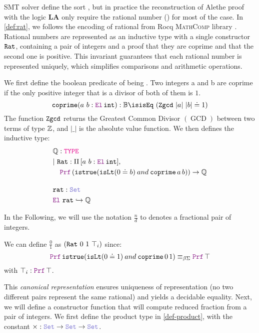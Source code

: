 
SMT solver define the sort , but in practice the reconstruction of Alethe proof with the logic \textbf{LA} only require the rational number (\Q) for most of the case.
In \cref{def:rat}, we follows the encoding of rational from Rocq \cite{Rocq-refman} \textsc{MathComp} library \cite{mathcomp}.
Rational numbers are represented as an inductive type with a single constructor $\texttt{\upshape{Rat}}$, containing a pair of integers and a proof that they are coprime and that the second one is positive.
This invariant guarantees that each rational number is represented uniquely, which simplifies comparisons and arithmetic operations.

\begin{definition}[Rational]\label{def:rat}
We first define the boolean predicate of being . Two integers a and b are coprime if the only positive integer that is a divisor of both of them is $1$.
\begin{equation*}
\kw{coprime} (a~b: \el\,\kw{int}): \B \is  \kw{isEq}~(\kw{Zgcd}~|a|~|b| \doteq 1)
\end{equation*}
The function $\texttt{\upshape{Zgcd}}$ returns the Greatest Common Divisor $(\mathop{GCD})$ between two terms of type $\mathbb{Z}$, and $|\_|$ is the absolute value function.
We then defines the inductive type:
\begin{align*}
& \Q: \type \\
& |~\kw{Rat}: \Pi\,[a~b: \el\,\kw{int}],\\
& \quad \prf\, (\kw{istrue} (\kw{isLt} (0 \doteq b) \mathbin{and} \kw{coprime}\,a\,b)) \ra \Q \\[1em]
&\kw{rat}: \set{} \\
&\el~\kw{rat} \re \Q
\end{align*}
\end{definition}

In the Following, we will use the notation $\frac{n}{d}$ to denotes a fractional pair of integers.


\begin{example}
We can define $\frac{0}{1}$ as $(\texttt{\upshape{Rat}}~0~1~\top_i)$ since:
\[
\prf\, \kw{istrue} (\kw{isLt} (0 \doteq 1) \mathbin{and} \kw{coprime}\,0\,1) \equivL \prf\,\top 
\]
with $\top_i : \prf\,\top$.
\end{example}

This \emph{canonical representation} ensures uniqueness of representation (no two different pairs represent the same rational) and yields a decidable equality.
Next, we will define a constructor function that will compute reduced fraction from a pair of integers.
We first define the product type in \cref{def-product}, with the constant $\times: \set \ra \set \ra \set$.


